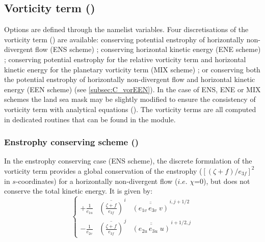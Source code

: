\documentclass[../tex_main/NEMO_manual]{subfiles}
\begin{document}
\subsection{Vorticity term (\protect{})}
\label{subsec:DYN_vor}


Options are defined through the  namelist variables.
Four discretisations of the vorticity term () are available: 
conserving potential enstrophy of horizontally non-divergent flow (ENS scheme) ; 
conserving horizontal kinetic energy (ENE scheme) ; conserving potential enstrophy for 
the relative vorticity term and horizontal kinetic energy for the planetary vorticity 
term (MIX scheme) ; or conserving both the potential enstrophy of horizontally non-divergent 
flow and horizontal kinetic energy (EEN scheme) (see \autoref{subsec:C_vorEEN}). In the 
case of ENS, ENE or MIX schemes the land sea mask may be slightly modified to ensure the 
consistency of vorticity term with analytical equations ().
The vorticity terms are all computed in dedicated routines that can be found in 
the  module.

\subsubsection{Enstrophy conserving scheme (\protect{})}
\label{subsec:DYN_vor_ens}

In the enstrophy conserving case (ENS scheme), the discrete formulation of the 
vorticity term provides a global conservation of the enstrophy 
($ [ (\zeta +f ) / e_{3f} ]^2 $ in $s$-coordinates) for a horizontally non-divergent 
flow ($i.e.$ $\chi$=$0$), but does not conserve the total kinetic energy. It is given by:
\begin{equation} \label{eq:dynvor_ens}
\left\{ 
\begin{aligned}
{+\frac{1}{e_{1u} } } & {\overline {\left( { \frac{\zeta +f}{e_{3f} }} \right)} }^{\,i} 
                                & {\overline{\overline {\left( {e_{1v}\,e_{3v}\;v} \right)}} }^{\,i, j+1/2}    \\
{- \frac{1}{e_{2v} } } & {\overline {\left( {\frac{\zeta +f}{e_{3f} }} \right)} }^{\,j}  
                                & {\overline{\overline {\left( {e_{2u}\,e_{3u}\;u} \right)}} }^{\,i+1/2, j}  
\end{aligned} 
 \right.
\end{equation} 
\end{document}
